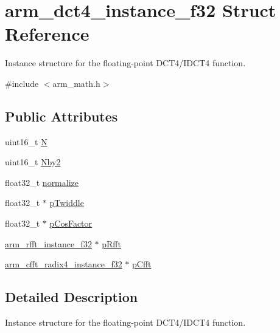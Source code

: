 \hypertarget{structarm__dct4__instance__f32}{\section{arm\-\_\-dct4\-\_\-instance\-\_\-f32 Struct Reference}
\label{structarm__dct4__instance__f32}
}


Instance structure for the floating-\/point D\-C\-T4/\-I\-D\-C\-T4 function.  




{\ttfamily \#include $<$arm\-\_\-math.\-h$>$}

\subsection*{Public Attributes}
\begin{DoxyCompactItemize}
\item 
uint16\-\_\-t \hyperlink{structarm__dct4__instance__f32_a262b29a51c371b46efc89120e31ccf37}{N}
\item 
uint16\-\_\-t \hyperlink{structarm__dct4__instance__f32_adb1ef2739ddbe62e5cdadc47455a4147}{Nby2}
\item 
float32\-\_\-t \hyperlink{structarm__dct4__instance__f32_a61ce8c967b2e998a9c0041cca73cdef8}{normalize}
\item 
float32\-\_\-t $\ast$ \hyperlink{structarm__dct4__instance__f32_ad13544aafad268588c62e3eb35ae662c}{p\-Twiddle}
\item 
float32\-\_\-t $\ast$ \hyperlink{structarm__dct4__instance__f32_a6da1187e070801e011ce5e0582efa861}{p\-Cos\-Factor}
\item 
\hyperlink{structarm__rfft__instance__f32}{arm\-\_\-rfft\-\_\-instance\-\_\-f32} $\ast$ \hyperlink{structarm__dct4__instance__f32_a978f37fc19add31af243ab5c63ae502f}{p\-Rfft}
\item 
\hyperlink{structarm__cfft__radix4__instance__f32}{arm\-\_\-cfft\-\_\-radix4\-\_\-instance\-\_\-f32} $\ast$ \hyperlink{structarm__dct4__instance__f32_a018f7860b6e070af533fb7d76c7cdc32}{p\-Cfft}
\end{DoxyCompactItemize}


\subsection{Detailed Description}
Instance structure for the floating-\/point D\-C\-T4/\-I\-D\-C\-T4 function. 

